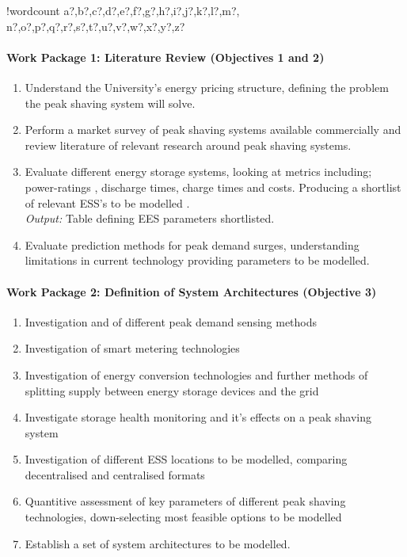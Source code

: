 \documentclass[10pt]{article}
\let\oldparagraph\paragraph
\renewcommand{\paragraph}[1]{\oldparagraph{#1}\mbox{}}
\newcounter{words}
\newenvironment{counted}{%
  \setcounter{words}{0}
  \SearchList!{wordcount}{\stepcounter{words}}
    {a?,b?,c?,d?,e?,f?,g?,h?,i?,j?,k?,l?,m?,
    n?,o?,p?,q?,r?,s?,t?,u?,v?,w?,x?,y?,z?}
  \UndoBoundary{'}
  \SearchOrder{p;}}{%
  \StopSearching}
\begin{document}
\begin{counted}
\paragraph{Work Package 1: Literature Review (Objectives 1 and
2)}\label{work-package-1-literature-review-objectives-1-and-2}

\begin{enumerate}[ label={1.\arabic*}]
\item Understand the University's energy pricing structure, defining the problem the peak shaving system will solve.
\item Perform a market survey of peak shaving systems available commercially and review literature of relevant research around peak shaving systems.
\item Evaluate different energy storage systems, looking at metrics including; power-ratings , discharge times, charge times and costs. Producing a shortlist of relevant ESS's to be modelled .\\ \textit{Output:} Table defining EES parameters shortlisted.
\item Evaluate prediction methods for peak demand surges, understanding limitations in current technology providing parameters to be modelled.
\end{enumerate}

\paragraph{Work Package 2: Definition of System Architectures (Objective
3)}\label{work-package-2-definition-of-system-architectures-objective-3}

\begin{enumerate}[ label={2.\arabic*}]
\item Investigation and of different peak demand sensing methods
\item Investigation of smart metering technologies
\item Investigation of energy conversion technologies and further methods of splitting supply between energy storage devices and the grid
\item Investigate storage health monitoring and it's effects on a peak shaving system
\item Investigation of different ESS locations to be modelled, comparing decentralised and centralised formats
\item Quantitive assessment of key parameters of different peak shaving technologies, down-selecting most feasible options to be modelled
\item Establish a set of system architectures to be modelled.
\end{enumerate}


\end{counted}
\end{document}
